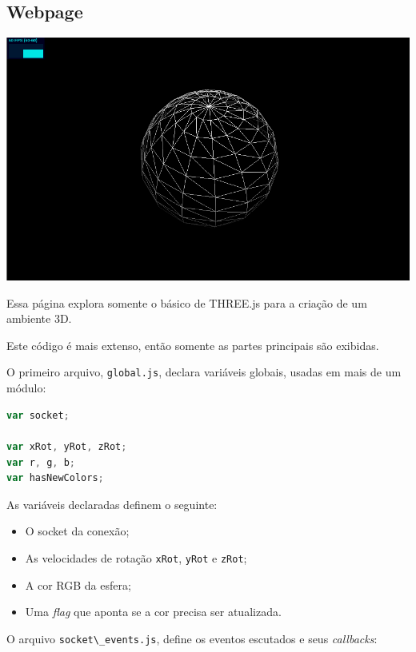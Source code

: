 \documentclass[a4paper,12pt]{article}
\newcommand{\code}[1]{\lstinline[mathescape=true, columns=fixed, basicstyle={\small\ttfamily}]{#1}}
\begin{document}
\subsection{Webpage}

\includegraphics[width=1\linewidth]{images/sphere.png}

Essa página explora somente o básico de THREE.js para a criação de um ambiente 3D.

Este código é mais extenso, então somente as partes principais são exibidas.

O primeiro arquivo, \code{global.js}, declara variáveis globais, usadas em mais de um módulo:


\begin{lstlisting}[language=JavaScript]
var socket;

var xRot, yRot, zRot;
var r, g, b;
var hasNewColors;
\end{lstlisting}

As variáveis declaradas definem o seguinte:

\begin{itemize}
  \item O socket da conexão;

  \item As velocidades de rotação \code{xRot}, \code{yRot} e \code{zRot};

  \item A cor RGB da esfera;

  \item Uma \emph{flag} que aponta se a cor precisa ser atualizada.
\end{itemize}


O arquivo \code{socket\_events.js}, define os eventos escutados e seus \emph{callbacks}:
\end{document}
